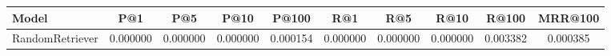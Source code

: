 \begin{tabular}{lccccccccc}
\toprule
Model & P@1 & P@5 & P@10 & P@100 & R@1 & R@5 & R@10 & R@100 & MRR@100 \\
\midrule
RandomRetriever & 0.000000 & 0.000000 & 0.000000 & 0.000154 & 0.000000 & 0.000000 & 0.000000 & 0.003382 & 0.000385 \\
\bottomrule
\end{tabular}
